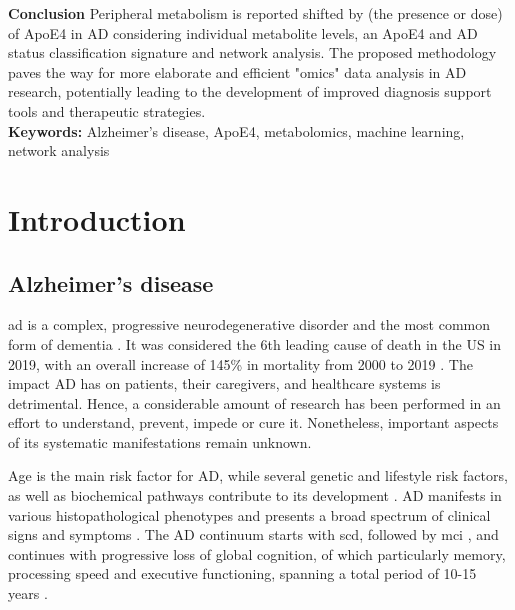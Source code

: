 \documentclass{amsart}
\newcommand{\mainmatter}{
    \newpage
    \pagenumbering{arabic}  %
}
\begin{document}
\textbf{Conclusion}\hspace{.1cm} Peripheral metabolism is reported shifted by (the presence or dose) of ApoE4 in AD considering individual metabolite levels, an ApoE4 and AD status classification signature and network analysis. The proposed methodology paves the way for more elaborate and efficient "omics" data analysis in AD research, potentially leading to the development of improved diagnosis support tools and therapeutic strategies.\\

\textbf{Keywords:}\hspace{.1cm} Alzheimer's disease, ApoE4, metabolomics, machine learning, network analysis 

\restoregeometry
\clearpage
\printacronyms[title = Abbreviations, toctitle = ABBREVIATIONS]

\newpage
\tableofcontents

\mainmatter

\newpage
\section{Introduction}\label{Intro}
\subsection{Alzheimer’s disease}
\acrfull{ad} is a complex, progressive neurodegenerative disorder and the most common form of dementia \cite{Penke2023NewDisease}. It was considered the 6th leading cause of death in the US in 2019, with an overall increase of 145\% in mortality from 2000 to 2019 \cite{20232023Figures}. The impact AD has on patients, their caregivers, and healthcare systems is detrimental. Hence, a considerable amount of research has been performed in an effort to understand, prevent, impede or cure it. Nonetheless, important aspects of its systematic manifestations remain unknown.

Age is the main risk factor for AD, while several genetic and lifestyle risk factors, as well as biochemical pathways contribute to its development \cite{Penke2023NewDisease}. AD manifests in various histopathological phenotypes and presents a broad spectrum of clinical signs and symptoms \cite{Heneka2015NeuroinflammationDisease, Edwards2019ANeurodegeneration}. The AD continuum starts with \acrfull{scd}, followed by \acrfull{mci} \cite*{AALDIJK2022101556}, and continues with progressive loss of global cognition, of which particularly memory, processing speed and executive functioning, spanning a total period of 10-15 years \cite{Scheltens2016AlzheimersDisease}. 
\end{document}

